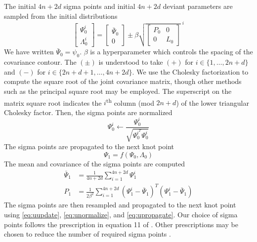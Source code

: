 The initial $4n + 2d$ sigma points and initial $4n + 2d$ deviant parameters are sampled
from the initial distributions
\begin{equation}\label{eq:uupdate}
  \begin{bmatrix} \Psi_{0}^{i} \\ \Lambda_{0}^{i} \end{bmatrix} =
  \begin{bmatrix} \bar{\Psi}_{0} \\ 0\end{bmatrix}
    \pm \beta \sqrt{\begin{bmatrix} P_{0} & 0\\ 0 & L_{0}\end{bmatrix}}^{\; i}
\end{equation}
We have written $\bar{\Psi}_{0} = \psi_{0}$. $\beta$
is a hyperparameter which controls the spacing of the covariance contour.
The $(\pm)$ is understood to take $(+)$ for $ i \in \{1, \dots, 2n + d\}$ and $(-)$ for
$i \in \{2n + d + 1, \dots, 4n + 2d\}$. We use the Cholesky factorization
to compute the square root of the
joint covariance matrix, though other methods
such as the principal square root may be employed.
The superscript on the matrix square root indicates the $i$\textsuperscript{th}
column (mod $2n + d$) of the lower triangular Cholesky factor.
Then, the sigma points are normalized
\begin{equation}\label{eq:unormalize}
  \Psi_{0}^{i} \gets \frac{\Psi_{0}^{i}}{\sqrt{\Psi_{0}^{i^{T}} \Psi_{0}^{i}}}
\end{equation}
The sigma points are propagated to the next knot point
\begin{equation}\label{eq:upropagate}
  \Psi_{1} = f(\Psi_{0}, \Lambda_{0})
\end{equation}
The mean and covariance of the sigma points are computed
\begin{align}
  \bar{\Psi}_{1} &= \frac{1}{4n + 2d} \sum_{i = 1}^{4n + 2d} \Psi_{1}^{i}\\
  P_{1} &= \frac{1}{2 \beta^{2}} \sum_{i = 1}^{4n + 2d}
  (\Psi^{i}_{1} - \bar{\Psi}_{1})^{T}(\Psi^{i}_{1} - \bar{\Psi}_{1})
\end{align}
The sigma points are then resampled and propagated to the next knot point using
\eqref{eq:uupdate}, \eqref{eq:unormalize}, and \eqref{eq:upropagate}. Our
choice of sigma points follows the prescription in equation 11 of \cite{julier2004unscented}.
Other prescriptions may be chosen to reduce the number of required sigma points \cite{julier2002reduced}.




